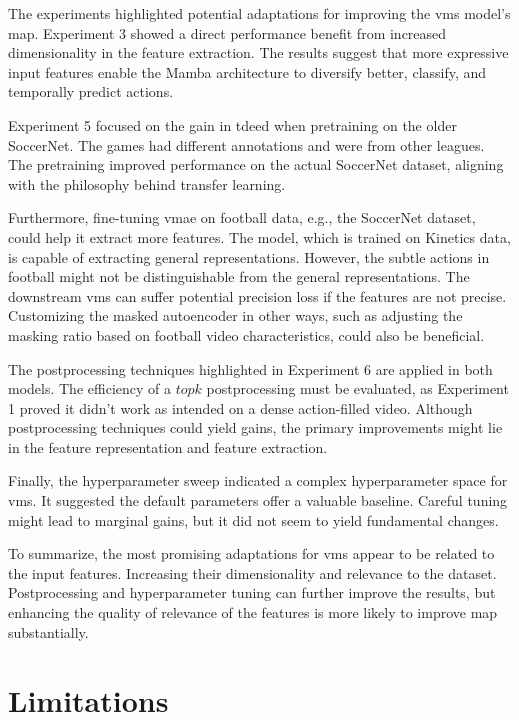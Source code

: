 The experiments highlighted potential adaptations for improving the \acrshort{vms} model's \acrshort{map}. Experiment 3 showed a direct performance benefit from increased dimensionality in the feature extraction. The results suggest that more expressive input features enable the Mamba architecture to diversify better, classify, and temporally predict actions. 

Experiment 5 focused on the gain in \acrshort{tdeed} when pretraining on the older SoccerNet. The games had different annotations and were from other leagues. The pretraining improved performance on the actual SoccerNet dataset, aligning with the philosophy behind transfer learning. 

Furthermore, fine-tuning \acrshort{vmae} on football data, e.g., the SoccerNet dataset, could help it extract more features. The model, which is trained on Kinetics data, is capable of extracting general representations. However, the subtle actions in football might not be distinguishable from the general representations. The downstream \acrshort{vms} can suffer potential precision loss if the features are not precise. Customizing the masked autoencoder in other ways, such as adjusting the masking ratio based on football video characteristics, could also be beneficial. 

The postprocessing techniques highlighted in Experiment 6 are applied in both models. The efficiency of a $topk$ postprocessing must be evaluated, as Experiment 1 proved it didn't work as intended on a dense action-filled video. Although postprocessing techniques could yield gains, the primary improvements might lie in the feature representation and feature extraction. 

Finally, the hyperparameter sweep indicated a complex hyperparameter space for \acrshort{vms}. It suggested the default parameters offer a valuable baseline. Careful tuning might lead to marginal gains, but it did not seem to yield fundamental changes. 

To summarize, the most promising adaptations for \acrshort{vms} appear to be related to the input features. Increasing their dimensionality and relevance to the dataset.  Postprocessing and hyperparameter tuning can further improve the results, but enhancing the quality of relevance of the features is more likely to improve \acrshort{map} substantially.


\section{Limitations}



